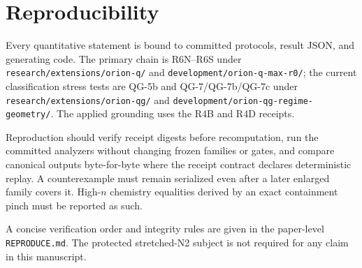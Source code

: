 \section{Reproducibility}

Every quantitative statement is bound to committed protocols, result JSON, and generating code. The primary chain is R6N--R6S under \texttt{research/extensions/orion-q/} and \texttt{development/orion-q-max-r0/}; the current classification stress tests are QG-5b and QG-7/QG-7b/QG-7c under \texttt{research/extensions/orion-qg/} and \texttt{development/orion-qg-regime-geometry/}. The applied grounding uses the R4B and R4D receipts.

Reproduction should verify receipt digests before recomputation, run the committed analyzers without changing frozen families or gates, and compare canonical outputs byte-for-byte where the receipt contract declares deterministic replay. A counterexample must remain serialized even after a later enlarged family covers it. High-$n$ chemistry equalities derived by an exact containment pinch must be reported as such.

A concise verification order and integrity rules are given in the paper-level \texttt{REPRODUCE.md}. The protected stretched-N2 subject is not required for any claim in this manuscript.
